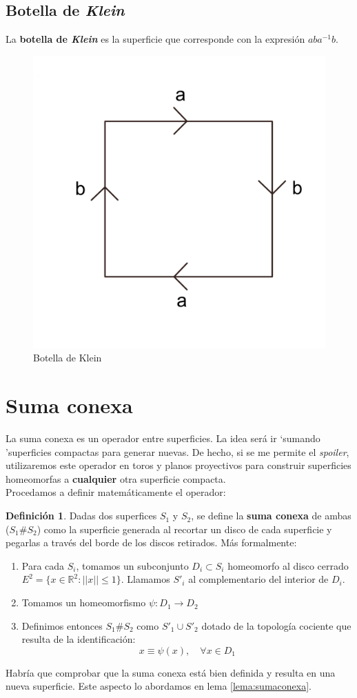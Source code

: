 \documentclass[a4paper,11pt,spanish, twoside, leqno]{tfg-uam}
\theoremstyle{definition}
\newtheorem{defin}[teor]{Definici\'on}
\begin{document}
\subsection*{Botella de \textit{Klein}}
	La \textbf{botella de \textit{Klein}} es la superficie que corresponde con la expresión $ aba^{-1}b $.

\begin{figure}[h!]
	\centering
	\includegraphics[width=0.3\linewidth]{imagenes/klein.png}
	\caption{Botella de Klein}
	\label{fig:botelladeklein expresion canónica}
\end{figure} 




\section{Suma conexa}

La suma conexa es un operador entre superficies. La idea será ir \textquoteleft sumando \textquoteright superficies compactas para generar nuevas. De hecho, si se me permite el \textit{spoiler}, utilizaremos este operador en toros y planos proyectivos para construir superficies homeomorfas a \textbf{cualquier} otra superficie compacta.\\
Procedamos a definir matemáticamente el operador:

\begin{defin}\label{defin:sumaconexa}
	Dadas dos superfices $S_1$ y $S_2$, se define la \textbf{suma conexa} de ambas ($S_1\#S_2$) como la superficie generada al recortar un disco de cada superficie y pegarlas a través del borde de los discos retirados. Más formalmente:
	\begin{enumerate}
		\item 
		Para cada $S_i$, tomamos un subconjunto $D_i\subset S_i$ homeomorfo al disco cerrado $E^2=\{x\in\mathbb{R}^2: ||x||\leq 1\}$. Llamamos $S'_i$ al complementario del interior de $D_i$.
		\item 
		Tomamos un homeomorfismo $\psi:D_1\longrightarrow D_2$
		\item 
		Definimos entonces $S_1\#S_2$ como $S'_1\cup S'_2$ dotado de la topología cociente que resulta de la identificación:
		\[
		x \equiv  \psi(x), \quad \forall x \in D_1
		\] 
	\end{enumerate}
	Habría que comprobar que la suma conexa está bien definida y resulta en una nueva superficie. Este aspecto lo abordamos en lema \ref{lema:sumaconexa}.
\end{defin}
\end{document}
